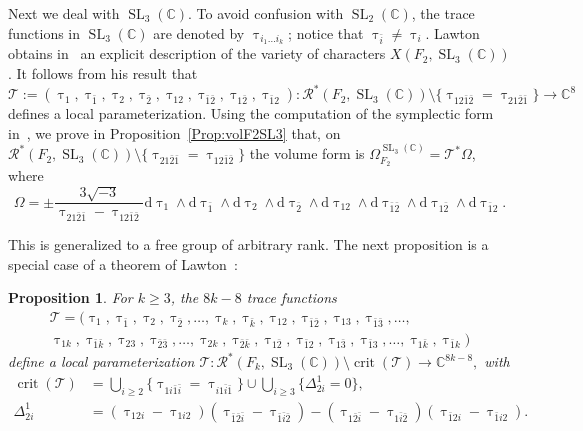\documentclass[11pt]{article}
\newtheorem{prop}[theo]{Proposition}
\theoremstyle{definition}
\numberwithin{equation}{section}
\numberwithin{figure}{section}
\numberwithin{table}{section}
\DeclareMathOperator{\SL}{SL}
\DeclareMathOperator{\crit}{crit}
\newcommand{\Rcal}{\mathcal{R}}
\newcommand{\Tcal}{\mathcal{T}}
\newcommand{\Cbb}{\mathbb{C}}
\newcommand*{\dd}{\mathrm{d}}
\begin{document}
Next we deal with $\SL_3(\Cbb)$. To avoid confusion with $\SL_2(\Cbb)$, the trace functions in $\SL_3(\Cbb)$ are denoted by $\uptau_{i_1\dots i_k}$; notice that $\uptau_{\bar i}\neq \uptau_i$. Lawton obtains in~\cite{LawtonJA} an explicit description of the variety of characters $X(F_2,\SL_3(\Cbb))$. It follows from his result that
\[
\Tcal := (\uptau_1, \uptau_{\bar 1},\uptau_2, \uptau_{\bar 2},\uptau_{12}, \uptau_{\bar 1\bar 2}, \uptau_{1\bar 2}, \uptau_{\bar 1 2})\colon
\Rcal^*(F_2,\SL_3(\Cbb)) \setminus \{ \uptau_{12\bar 1\bar 2}= \uptau_{21\bar 2\bar 1} \}\to \Cbb^8
\]
defines a local parameterization. Using the computation of the symplectic form in~\cite{LawtonP}, we prove in Proposition~\ref{Prop:volF2SL3} that, on $\Rcal^*(F_2,\SL_3(\Cbb)) \setminus \{ \uptau_{21\bar2\bar1}= \uptau_{12\bar1\bar2}\}$ the volume form is $\Omega_{F_2}^{\SL_3(\Cbb)}=\Tcal^*\Omega$, where
\[
\Omega=\pm \frac{3\sqrt{-3}}{ \uptau_{21\bar2\bar1}-\uptau_{12\bar1\bar2}} \dd \uptau_1\wedge \dd \uptau_{\bar 1} \wedge \dd \uptau_2\wedge \dd \uptau_{\bar 2}
\wedge \dd \uptau_{12}\wedge \dd \uptau_{\bar 1\bar 2}\wedge \dd \uptau_{1\bar 2}\wedge \dd \uptau_{\bar 1 2}.
\]

This is generalized to a free group of arbitrary rank. The next proposition is a special case of a theorem of Lawton~\cite[Theorem~6]{LawtonAI}:

\begin{prop}\label{prop:FkSL3}
For $k\geq 3 $, the $8k-8$ trace functions
\begin{multline*}
\Tcal= (\uptau_1, \uptau_{\bar 1},\uptau_2, \uptau_{\bar 2},\dots, \uptau_k, \uptau_{\bar k}, \uptau_{12}, \uptau_{\bar 1\bar 2}, \uptau_{13}, \uptau_{\bar 1\bar 3},\dots,\\
\uptau_{1k}, \uptau_{\bar 1\bar k},
\uptau_{23}, \uptau_{\bar 2\bar 3},\dots, \uptau_{2k}, \uptau_{\bar 2\bar k},
\uptau_{1\bar 2}, \uptau_{\bar 1 2}, \uptau_{1\bar 3}, \uptau_{\bar 1 3}, \dots, \uptau_{1\bar k}, \uptau_{\bar 1 k})
\end{multline*}
define a local parameterization $
\Tcal\colon \Rcal^*(F_k,\SL_3(\Cbb)) \setminus \crit(\Tcal)
\to \Cbb^{8k-8}, $ with
\begin{align*}
\crit(\Tcal)&=\bigcup_{i\geq 2} \{ \uptau_{1i\bar 1\bar i}= \uptau_{i1\bar i\bar 1} \} \cup \bigcup_{i\geq 3}\{ \varDelta^1_{2i} =0\}, \\
\varDelta^1_{2i} &= (\uptau_{12i}-\uptau_{1i2}) (\uptau_{\bar 1\bar 2\bar i}-\uptau_{\bar 1\bar i\bar 2}) - (\uptau_{1\bar 2\bar i}-\uptau_{1\bar i\bar 2}) (\uptau_{\bar 1 2 i}-\uptau_{\bar 1 i 2 }).
\end{align*}
\end{prop}
\end{document}
